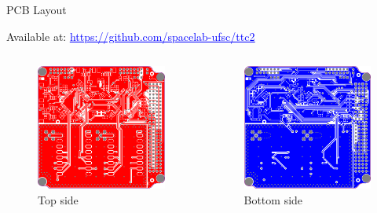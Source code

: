 \begin{frame}{PCB Layout}

    Available at: \href{https://github.com/spacelab-ufsc/ttc2/tree/master/hardware/sources}{\textcolor{blue}{\underline{https://github.com/spacelab-ufsc/ttc2}}}

    \begin{columns}[t]
        \begin{column}[t]{0.5\textwidth}
            \begin{figure}[!ht]
                \begin{center}
                    \includegraphics[width=5cm]{figures/ttc2-layout-top.png}
                \end{center}
                \caption{Top side}
            \end{figure}
        \end{column}
        \begin{column}[t]{0.5\textwidth}
            \begin{figure}[!ht]
                \begin{center}
                    \includegraphics[width=5cm]{figures/ttc2-layout-bottom.png}
                \end{center}
                \caption{Bottom side}
            \end{figure}
        \end{column}
    \end{columns}

\end{frame}

